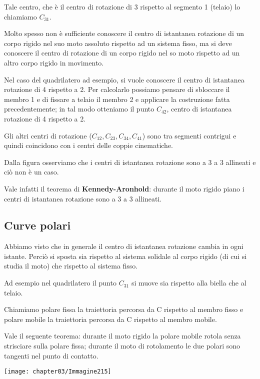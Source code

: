Tale centro, che è il centro di rotazione di 3 rispetto al segmento 1 (telaio) lo chiamiamo $C_{31}$.

Molto spesso non è sufficiente conoscere il centro di istantanea rotazione di un corpo rigido nel suo moto assoluto rispetto ad un sistema fisso, ma si deve conoscere il centro di rotazione di un corpo rigido nel so moto rispetto ad un altro corpo rigido in movimento.

Nel caso del quadrilatero ad esempio, si vuole conoscere il centro di istantanea rotazione di 4 rispetto a 2. Per calcolarlo possiamo pensare di sbloccare il membro 1 e di fissare a telaio il membro 2 e applicare la costruzione fatta precedentemente; in tal modo otteniamo il punto $C_{42}$, centro di istantanea rotazione di 4 rispetto a 2.

Gli altri centri di rotazione ($C_{12}, C_{23}, C_{34}, C_{41}$) sono tra segmenti contrigui e quindi coincidono con i centri delle coppie cinematiche.

Dalla figura osserviamo che i centri di istantanea rotazione sono a 3 a 3 allineati e ciò non è un caso.

Vale infatti il teorema di \textbf{Kennedy-Aronhold}: durante il moto rigido piano i centri di istantanea rotazione sono a 3 a 3 allineati. 

\subsection{Curve polari}

Abbiamo visto che in generale il centro di istantanea rotazione cambia in ogni istante. Perciò si sposta sia rispetto al sistema solidale al corpo rigido (di cui si studia il moto) che rispetto al sistema fisso.

Ad esempio nel quadrilatero il punto $C_{31}$ si muove sia rispetto alla biella che al telaio.

Chiamiamo polare fissa la traiettoria percorsa da C rispetto al membro fisso e polare mobile la traiettoria percorsa da C rispetto al membro mobile.

Vale il seguente teorema: durante il moto rigido la polare mobile rotola senza strisciare sulla polare fissa; durante il moto di rotolamento le due polari sono tangenti nel punto di contatto.

\begin{center}
\texttt{[image: chapter03/Immagine215]}
\end{center}

